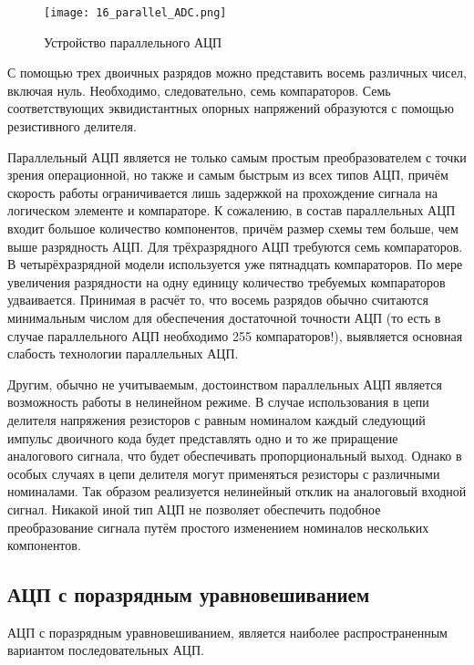 \begin{figure}[H]
\centering
\texttt{[image: 16\_parallel\_ADC.png]}
\caption{Устройство параллельного АЦП}
\label{fig:16_parallel_ADC}
\end{figure}

С помощью трех двоичных разрядов можно представить восемь различных чисел, включая нуль. Необходимо, следовательно, семь компараторов. Семь соответствующих эквидистантных опорных напряжений образуются с помощью резистивного делителя.

Параллельный АЦП является не только самым простым преобразователем с точки зрения операционной, но также и самым быстрым из всех типов АЦП, причём скорость работы ограничивается лишь задержкой на прохождение сигнала на логическом элементе и компараторе. К сожалению, в состав параллельных АЦП входит большое количество компонентов, причём размер схемы тем больше, чем выше разрядность АЦП. Для трёхразрядного АЦП требуются семь компараторов. В четырёхразрядной модели используется уже пятнадцать компараторов. По мере увеличения разрядности на одну единицу количество требуемых компараторов удваивается. Принимая в расчёт то, что восемь разрядов обычно считаются минимальным числом для обеспечения достаточной точности АЦП (то есть в случае параллельного АЦП необходимо 255 компараторов!), выявляется основная слабость технологии параллельных АЦП.

Другим, обычно не учитываемым, достоинством параллельных АЦП является возможность работы в нелинейном режиме. В случае использования в цепи делителя напряжения резисторов с равным номиналом каждый следующий импульс двоичного кода будет представлять одно и то же приращение аналогового сигнала, что будет обеспечивать пропорциональный выход. Однако в особых случаях в цепи делителя могут применяться резисторы с различными номиналами. Так образом реализуется нелинейный отклик на аналоговый входной сигнал. Никакой иной тип АЦП не позволяет обеспечить подобное преобразование сигнала путём простого изменением номиналов нескольких компонентов.

\subsection*{АЦП с поразрядным уравновешиванием}

АЦП с поразрядным уравновешиванием, является наиболее распространенным вариантом последовательных АЦП.

